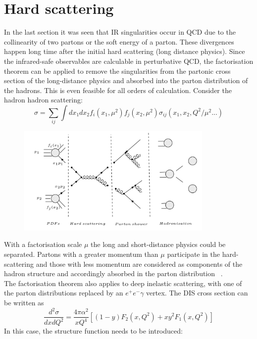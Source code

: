 \section{Hard scattering}
\label{Hard scattering}
In the last section it was seen that IR singularities occur in QCD due to the collinearity of two partons or the soft energy of a parton. These divergences happen long time after the initial hard scattering (long distance physics). Since the infrared-safe observables are calculable in perturbative QCD, the factorisation theorem can be applied to remove the singularities from the partonic cross section of the long-distance physics and absorbed into the parton distribution of the hadrons. This is even feasible for all orders of calculation. Consider the hadron hadron scattering:
\begin{equation}
\sigma = \sum_{ij} \int dx_1 dx_2 f_i(x_1, \mu^2)f_j(x_2, \mu^2) \sigma_{ij}(x_1, x_2, Q^2/\mu^2... )
\end{equation}
\begin{figure}[h!]
\centering
\includegraphics[width=0.85\textwidth]{images/Intro/Hard.png}
\end{figure}
With a factorisation scale $ \mu $ the long and short-distance physics could be separated. Partons with a greater momentum than $ \mu $ participate in the hard-scattering and those with less momentum are considered as components of the hadron structure and accordingly absorbed in the parton distribution ~\cite{Nagy:2006kb}.\\
The factorisation theorem also applies to deep inelastic scattering,
with one of the parton distributions replaced by an $ e^+ e^- \gamma $ vertex. The DIS cross section can be written as ~\cite{Ellis:1991qj}
\begin{equation}
\frac{d^2 \sigma}{dx dQ^2}=\frac{4\pi \alpha^2}{x Q^4}[(1-y)F_2 (x, Q^2)+xy^2 F_1(x, Q^2)]
\end{equation}
In this case, the structure function needs to be introduced: 

